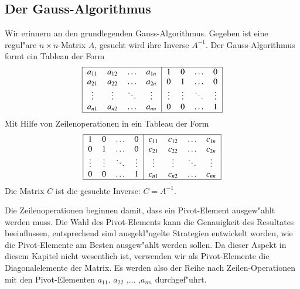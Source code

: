 \subsection{Der Gauss-Algorithmus}
Wir erinnern an den grundlegenden Gauss-Algorithmus.
Gegeben ist eine regul"are
$n\times n$-Matrix $A$, gesucht wird ihre Inverse $A^{-1}$.
Der Gauss-Algorithmus formt ein Tableau der Form
\begin{equation}
\begin{tabular}{|>{$}c<{$}>{$}c<{$}>{$}c<{$}>{$}c<{$}|>{$}c<{$}>{$}c<{$}>{$}c<{$}>{$}c<{$}|}
\hline
a_{11}&a_{12}&\dots &a_{1n}&1     &0     &\dots &0\\
a_{21}&a_{22}&\dots &a_{2n}&0     &1     &\dots &0\\
\vdots&\vdots&\ddots&\vdots&\vdots&\vdots&\ddots&\vdots\\
a_{n1}&a_{n2}&\dots &a_{nn}&0     &0     &\dots &1\\
\hline
\end{tabular}
\label{starttableau}
\end{equation}
Mit Hilfe von Zeilenoperationen in ein Tableau der Form
\begin{equation}
\begin{tabular}{|>{$}c<{$}>{$}c<{$}>{$}c<{$}>{$}c<{$}|>{$}c<{$}>{$}c<{$}>{$}c<{$}>{$}c<{$}|}
\hline
1     &0     &\dots &0     & c_{11}&c_{12}&\dots &c_{1n}\\
0     &1     &\dots &0     & c_{21}&c_{22}&\dots &c_{2n}\\
\vdots&\vdots&\ddots&\vdots& \vdots&\vdots&\ddots&\vdots\\
0     &0     &\dots &1     & c_{n1}&c_{n2}&\dots &c_{nn}\\
\hline
\end{tabular}
\label{targettableau}
\end{equation}
Die Matrix $C$ ist die gesuchte Inverse: $C=A^{-1}$.

Die Zeilenoperationen beginnen damit, dass ein Pivot-Element ausgew"ahlt
werden muss.
Die Wahl des Pivot-Elements kann die Genauigkeit des Resultates beeinflussen,
entsprechend sind ausgekl"ugelte Strategien entwickelt worden, wie die
Pivot-Elemente am Besten ausgew"ahlt werden sollen. Da dieser Aspekt in
diesem Kapitel nicht wesentlich ist, verwenden wir als Pivot-Elemente die
Diagonalelemente der Matrix. Es werden also der Reihe nach Zeilen-Operationen
mit den Pivot-Elementen $a_{11}$, $a_{22}$ ,$\dots$ ,$a_{nn}$ 
durchgef"uhrt.

